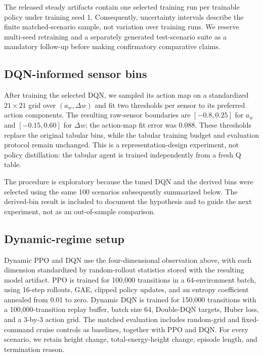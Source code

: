 \documentclass{article}
\begin{document}
The released steady artifacts contain one selected training run per trainable
policy under training seed 1.  Consequently, uncertainty intervals describe the
finite matched-scenario sample, not variation over training runs.  We reserve
multi-seed retraining and a separately generated test-scenario suite as a
mandatory follow-up before making confirmatory comparative claims.

\subsection{DQN-informed sensor bins}

After training the selected DQN, we sampled its action map on a standardized
$21\times21$ grid over $(a_w,\Delta w)$ and fit two thresholds per sensor to
its preferred action components.  The resulting raw-sensor boundaries are
$[-0.8,0.25]$ for $a_w$ and $[-0.15,0.60]$ for $\Delta w$; the action-map fit
error was 0.088.  These thresholds replace the original tabular bins, while
the tabular training budget and evaluation protocol remain unchanged.  This is
a representation-design experiment, not policy distillation: the tabular agent
is trained independently from a fresh Q table.

The procedure is exploratory because the tuned DQN and the derived bins were
selected using the same 100 scenarios subsequently summarized below.  The
derived-bin result is included to document the hypothesis and to guide the
next experiment, not as an out-of-sample comparison.

\subsection{Dynamic-regime setup}
\label{sec:dynamic_protocol}

Dynamic PPO and DQN use the four-dimensional observation above, with each
dimension standardized by random-rollout statistics stored with the resulting
model artifact.  PPO is trained for 100,000 transitions in a 64-environment
batch, using 16-step rollouts, GAE, clipped policy updates, and an entropy
coefficient annealed from 0.01 to zero.  Dynamic DQN is trained for 150,000
transitions with a 100,000-transition replay buffer, batch size 64, Double-DQN
targets, Huber loss, and a 3-by-3 action grid.  The matched evaluation includes
random-grid and fixed-command cruise controls as baselines, together with PPO
and DQN.  For every scenario, we retain height change, total-energy-height
change, episode length, and termination reason.
\end{document}
